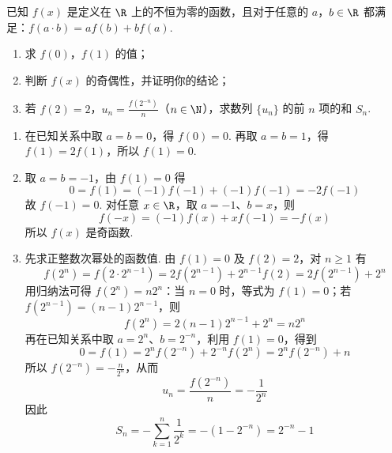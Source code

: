 \begin{problem}
已知 \(f(x)\) 是定义在 \(\R\) 上的不恒为零的函数，且对于任意的 \(a\)，\(b\in\R\) 都满足：\(f(a\cdot b)=af(b)+bf(a)\).

\begin{enumerate}
\item 求 \(f(0)\)，\(f(1)\) 的值；
\item 判断 \(f(x)\) 的奇偶性，并证明你的结论；
\item 若 \(f(2)=2\)，\(u_n=\frac{f(2^{-n})}{n}\)（\(n\in\N\)），求数列 \(\{u_n\}\) 的前 \(n\) 项的和 \(S_n\).
\end{enumerate}

\begin{solution}
\begin{enumerate}
\item 在已知关系中取 \(a=b=0\)，得 \(f(0)=0\). 再取 \(a=b=1\)，得 \(f(1)=2f(1)\)，所以 \(f(1)=0\).
\item 取 \(a=b=-1\)，由 \(f(1)=0\) 得
\[
0=f(1)=(-1)f(-1)+(-1)f(-1)=-2f(-1)
\]
故 \(f(-1)=0\). 对任意 \(x\in\R\)，取 \(a=-1\)、\(b=x\)，则
\[
f(-x)=(-1)f(x)+x f(-1)=-f(x)
\]
所以 \(f(x)\) 是奇函数.
\item 先求正整数次幂处的函数值. 由 \(f(1)=0\) 及 \(f(2)=2\)，对 \(n\geqslant1\) 有
\[
f(2^n)=f(2\cdot2^{n-1})=2f(2^{n-1})+2^{n-1}f(2)=2f(2^{n-1})+2^n
\]
用归纳法可得 \(f(2^n)=n2^n\)：当 \(n=0\) 时，等式为 \(f(1)=0\)；若 \(f(2^{n-1})=(n-1)2^{n-1}\)，则
\[
f(2^n)=2(n-1)2^{n-1}+2^n=n2^n
\]
再在已知关系中取 \(a=2^n\)、\(b=2^{-n}\)，利用 \(f(1)=0\)，得到
\[
0=f(1)=2^n f(2^{-n})+2^{-n}f(2^n)=2^n f(2^{-n})+n
\]
所以 \(f(2^{-n})=-\frac{n}{2^n}\)，从而
\[
u_n=\frac{f(2^{-n})}{n}=-\frac{1}{2^n}
\]
因此
\[
S_n=-\sum_{k=1}^{n}\frac{1}{2^k}=-(1-2^{-n})=2^{-n}-1
\]
\end{enumerate}
\end{solution}
\end{problem}
